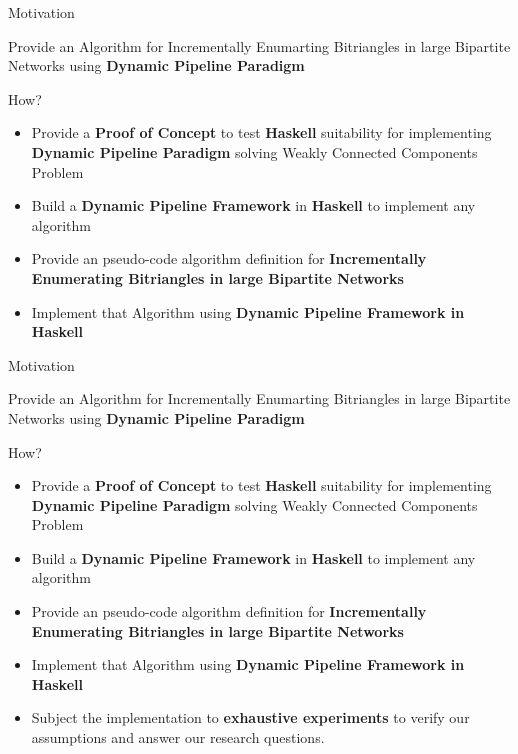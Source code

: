 \begin{frame}[fragile]{Motivation}
  \begin{center}
    Provide an Algorithm for Incrementally Enumarting Bitriangles in large Bipartite Networks using \textbf{Dynamic Pipeline Paradigm}
  \end{center}    
  \begin{block}{How?}
    \begin{itemize}
      \item {\color{light}Provide a \textbf{Proof of Concept} to test \textbf{Haskell} suitability for implementing  \textbf{Dynamic Pipeline Paradigm} solving Weakly Connected Components Problem}
      \item {\color{light}Build a \textbf{Dynamic Pipeline Framework} in \textbf{Haskell} to implement any algorithm }
      \item {\color{light}Provide an pseudo-code algorithm definition for \textbf{Incrementally Enumerating Bitriangles in large Bipartite Networks}}
      \item Implement that Algorithm using \textbf{Dynamic Pipeline Framework in Haskell}
  \end{itemize}   
\end{block} 
\end{frame}

\begin{frame}[fragile]{Motivation}
  \begin{center}
    Provide an Algorithm for Incrementally Enumarting Bitriangles in large Bipartite Networks using \textbf{Dynamic Pipeline Paradigm}
  \end{center}    
  \begin{block}{How?}
    \begin{itemize}
      \item {\color{light}Provide a \textbf{Proof of Concept} to test \textbf{Haskell} suitability for implementing  \textbf{Dynamic Pipeline Paradigm} solving Weakly Connected Components Problem}
      \item {\color{light}Build a \textbf{Dynamic Pipeline Framework} in \textbf{Haskell} to implement any algorithm }
      \item {\color{light}Provide an pseudo-code algorithm definition for \textbf{Incrementally Enumerating Bitriangles in large Bipartite Networks}}
      \item {\color{light}Implement that Algorithm using \textbf{Dynamic Pipeline Framework in Haskell}}
      \item Subject the implementation to \textbf{exhaustive experiments} to verify our assumptions and answer our research questions.
  \end{itemize}   
\end{block} 
\end{frame}

